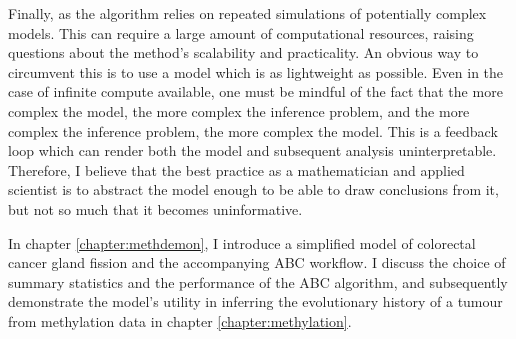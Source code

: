 Finally, as the algorithm relies on repeated simulations of
potentially complex models. This can require a large amount of computational resources, raising questions about
the method's scalability and practicality. An obvious way to circumvent this is to use a model which is as
lightweight as possible. Even in the case of infinite compute available, one must be mindful of the fact that
the more complex the model, the more complex the inference problem, and the more complex the inference problem,
the more complex the model. This is a feedback loop which can render both the model and subsequent analysis
uninterpretable. Therefore, I believe that the best practice as a mathematician and applied scientist is to abstract
the model enough to be able to draw conclusions from it, but not so much that it becomes uninformative. \par
In chapter \ref{chapter:methdemon}, I introduce a simplified model of colorectal cancer gland fission and
the accompanying ABC workflow. I discuss the choice of summary statistics and the performance of the ABC
algorithm, and subsequently demonstrate the model's utility in inferring the evolutionary history of a tumour
from methylation data in chapter \ref{chapter:methylation}.


